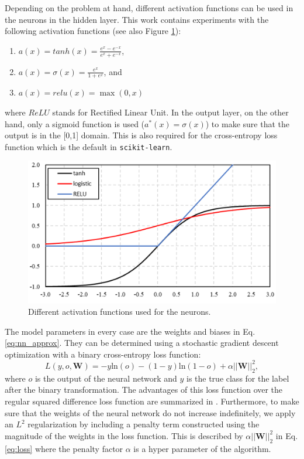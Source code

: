\documentclass[paper=a4, fontsize=11pt]{scrartcl} %
\begin{document}
Depending on the problem at hand, different activation functions can be used in the neurons in the hidden layer. 
This work contains experiments with the following activation functions (see also Figure \ref{fig:act_functions}):
\begin{enumerate}
	\item $a(x) = tanh(x)=\frac{e^x-e^{-x}}{e^x+e^{-x}}$,
	\item $a(x) = \sigma(x)=\frac{e^{x}}{1+e^{x}}$, and
	\item $a(x) = relu(x)=\max(0, x)$
\end{enumerate}

where $ReLU$ stands for Rectified Linear Unit.
In the output layer, on the other hand, only a sigmoid function is used ($a^*(x)=\sigma(x)$) to make sure that the output is in the [0,1] domain.
This is also required for the cross-entropy loss function which is the default in \texttt{scikit-learn}.

\begin{figure}[H]
	\centering
	\includegraphics[width=0.55\linewidth]{figures/activation_function}
	\caption{Different activation functions used for the neurons.}
	\label{fig:act_functions}
\end{figure}

The model parameters in every case are the weights and biases in Eq. \eqref{eq:nn_approx}.
They can be determined using a stochastic gradient descent optimization with a binary cross-entropy loss function:
\begin{equation}
L(y,o,\textbf{W})=-y\text{ln}(o)-(1-y)\text{ln}(1-o)+\alpha ||\textbf{W}||_2^2,
\label{eq:loss}
\end{equation}
where $o$ is the output of the neural network and $y$ is the true class for the label after the binary transformation.
The advantages of this loss function over the regular squared difference loss function are summarized in \cite{Goodfellow-et-al-2016}.
Furthermore, to make sure that the weights of the neural network do not increase indefinitely, we apply an $L^2$ regularization by including a penalty term constructed using the magnitude of the weights in the loss function. 
This is described by $\alpha ||\textbf{W}||_2^2$ in Eq. \eqref{eq:loss} where the penalty factor $\alpha$ is a hyper parameter of the algorithm.
\end{document}
